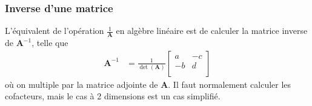 \documentclass[french, landscape]{article}
\begin{document}
\begin{multicols*}{3}
\subsubsection*{Inverse d'une matrice} L'équivalent de l'opération $\frac{1}{\bm{A}}$ en algèbre linéaire est de calculer la matrice inverse de $\bm{A}^{-1}$, telle que
\begin{align*}
\bm{A}^{-1}	& = \frac{1}{\det(\bm{A})}
\begin{bmatrix}
a	& -c \\
-b	& d \\
\end{bmatrix}
\end{align*}
où on multiple par la matrice adjointe de $\bm{A}$. Il faut normalement calculer les cofacteurs, mais le cas à 2 dimensions est un cas simplifié.



\end{multicols*}


\end{document}
